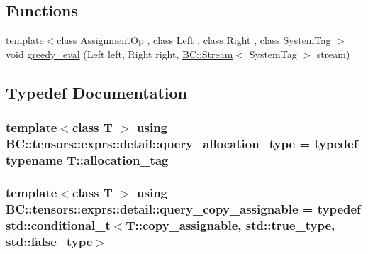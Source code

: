 \subsection*{Functions}
\begin{DoxyCompactItemize}
\item 
{\footnotesize template$<$class Assignment\+Op , class Left , class Right , class System\+Tag $>$ }\\void \hyperlink{namespaceBC_1_1tensors_1_1exprs_1_1detail_a8a431fe0c7e60521455a0786d23237a1}{greedy\+\_\+eval} (Left left, Right right, \hyperlink{namespaceBC_abc64a63cd29a22d102a68f478dfd588d}{B\+C\+::\+Stream}$<$ System\+Tag $>$ stream)
\end{DoxyCompactItemize}


\subsection{Typedef Documentation}
\subsubsection[{\texorpdfstring{query\+\_\+allocation\+\_\+type}{query_allocation_type}}]{\setlength{\rightskip}{0pt plus 5cm}template$<$class T $>$ using {\bf B\+C\+::tensors\+::exprs\+::detail\+::query\+\_\+allocation\+\_\+type} = typedef typename T\+::allocation\+\_\+tag}\hypertarget{namespaceBC_1_1tensors_1_1exprs_1_1detail_af7ba0020a7b4a640c05dbf54f8085f29}{}\label{namespaceBC_1_1tensors_1_1exprs_1_1detail_af7ba0020a7b4a640c05dbf54f8085f29}
\subsubsection[{\texorpdfstring{query\+\_\+copy\+\_\+assignable}{query_copy_assignable}}]{\setlength{\rightskip}{0pt plus 5cm}template$<$class T $>$ using {\bf B\+C\+::tensors\+::exprs\+::detail\+::query\+\_\+copy\+\_\+assignable} = typedef std\+::conditional\+\_\+t$<$T\+::copy\+\_\+assignable, std\+::true\+\_\+type, std\+::false\+\_\+type$>$}\hypertarget{namespaceBC_1_1tensors_1_1exprs_1_1detail_a16becd96cbdec2a9f4c4e0354ab5897c}{}\label{namespaceBC_1_1tensors_1_1exprs_1_1detail_a16becd96cbdec2a9f4c4e0354ab5897c}
